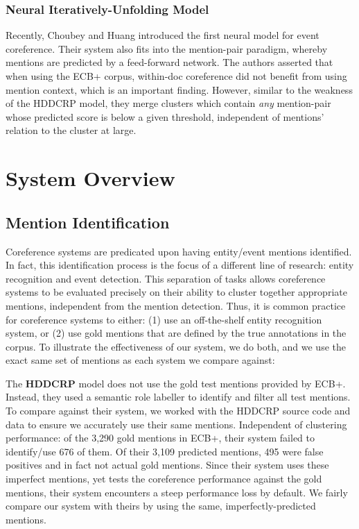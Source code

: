 \documentclass[11pt,a4paper]{article}
\begin{document}
\subsubsection{Neural Iteratively-Unfolding Model}
\label{sec:Choubey}
Recently, Choubey and Huang  introduced the first neural model for event coreference.  Their system also fits into the mention-pair paradigm, whereby mentions are predicted by a feed-forward network.  The authors asserted that when using the ECB+ corpus, within-doc coreference did not benefit from using mention context, which is an important finding.  However, similar to the weakness of the HDDCRP model, they merge clusters which contain \textit{any} mention-pair whose predicted score is below a given threshold, independent of mentions' relation to the cluster at large.


\section{System Overview}
\subsection{Mention Identification}
\label{sec:mentionid}
Coreference systems are predicated upon having entity/event mentions identified.  In fact, this identification process is the focus of a different line of research: entity recognition and event detection.  This separation of tasks allows coreference systems to be evaluated precisely on their ability to cluster together appropriate mentions, independent from the mention detection.  Thus, it is common practice for coreference systems to either: (1) use an off-the-shelf entity recognition system, or (2) use gold mentions that are defined by the true annotations in the corpus.  To illustrate the effectiveness of our system, we do both, and we use the exact same set of mentions as each system we compare against:


The \textbf{HDDCRP} model does not use the gold test mentions provided by ECB+.  Instead, they used a semantic role labeller to identify and filter all test mentions.
To compare against their system, we worked with the HDDCRP source code and data to ensure we accurately use their same mentions.  Independent of clustering performance: of the 3,290 gold mentions in ECB+, their system failed to identify/use 676 of them.  Of their 3,109 predicted mentions, 495 were false positives and in fact not actual gold mentions.  Since their system uses these imperfect mentions, yet tests the coreference performance against the gold mentions, their system encounters a steep performance loss by default.  We fairly compare our system with theirs by using the same, imperfectly-predicted mentions.
\end{document}

